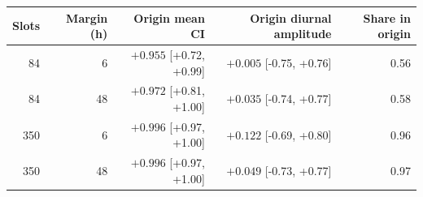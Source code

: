 \begin{tabular}{rrrrr}
\toprule
Slots & Margin (h) & Origin mean CI & Origin diurnal amplitude & Share in origin \\
\midrule
84 & 6 & $+0.955$ [+0.72, +0.99] & $+0.005$ [-0.75, +0.76] & 0.56 \\
84 & 48 & $+0.972$ [+0.81, +1.00] & $+0.035$ [-0.74, +0.77] & 0.58 \\
350 & 6 & $+0.996$ [+0.97, +1.00] & $+0.122$ [-0.69, +0.80] & 0.96 \\
350 & 48 & $+0.996$ [+0.97, +1.00] & $+0.049$ [-0.73, +0.77] & 0.97 \\
\bottomrule
\end{tabular}

